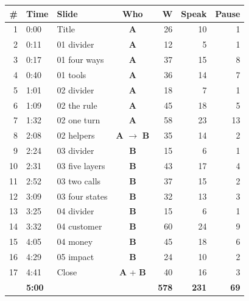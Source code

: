 \documentclass[11pt,a4paper]{article}
\begin{document}
\medskip
{\footnotesize
\noindent
\begin{tabular*}{\linewidth}{@{\extracolsep{\fill}}r@{\hspace{10pt}}l@{\hspace{10pt}}l@{\hspace{10pt}}c@{\hspace{10pt}}r@{\hspace{10pt}}r@{\hspace{10pt}}r@{}}
\toprule
\textbf{\#} & \textbf{Time} & \textbf{Slide} & \textbf{Who} & \textbf{W} & \textbf{Speak} & \textbf{Pause} \\
\midrule
\midrule
1  & 0:00 & Title                & \textcolor{colA}{\textbf{A}} & 26 & 10 & 1 \\
2  & 0:11 & 01 divider           & \textcolor{colA}{\textbf{A}} & 12 & 5 & 1 \\
3  & 0:17 & 01 four ways         & \textcolor{colA}{\textbf{A}} & 37 & 15 & 8 \\
4  & 0:40 & 01 tools             & \textcolor{colA}{\textbf{A}} & 36 & 14 & 7 \\
5  & 1:01 & 02 divider           & \textcolor{colA}{\textbf{A}} & 18 & 7 & 1 \\
6  & 1:09 & 02 the rule          & \textcolor{colA}{\textbf{A}} & 45 & 18 & 5 \\
7  & 1:32 & 02 one turn          & \textcolor{colA}{\textbf{A}} & 58 & 23 & 13 \\
8  & 2:08 & 02 helpers           & \textcolor{colA}{\textbf{A}} $\rightarrow$ \textcolor{colB}{\textbf{B}} & 35 & 14 & 2 \\
\midrule
9  & 2:24 & 03 divider           & \textcolor{colB}{\textbf{B}} & 15 & 6 & 1 \\
10 & 2:31 & 03 five layers       & \textcolor{colB}{\textbf{B}} & 43 & 17 & 4 \\
11 & 2:52 & 03 two calls         & \textcolor{colB}{\textbf{B}} & 37 & 15 & 2 \\
12 & 3:09 & 03 four states       & \textcolor{colB}{\textbf{B}} & 32 & 13 & 3 \\
13 & 3:25 & 04 divider           & \textcolor{colB}{\textbf{B}} & 15 & 6 & 1 \\
14 & 3:32 & 04 customer          & \textcolor{colB}{\textbf{B}} & 60 & 24 & 9 \\
15 & 4:05 & 04 money             & \textcolor{colB}{\textbf{B}} & 45 & 18 & 6 \\
16 & 4:29 & 05 impact            & \textcolor{colB}{\textbf{B}} & 24 & 10 & 2 \\
\midrule
17 & 4:41 & Close                & \textcolor{colA}{\textbf{A}} + \textcolor{colB}{\textbf{B}} & 40 & 16 & 3 \\
\midrule
   & \textbf{5:00} & & & \textbf{578} & \textbf{231} & \textbf{69} \\
\bottomrule
\end{tabular*}}
\end{document}
